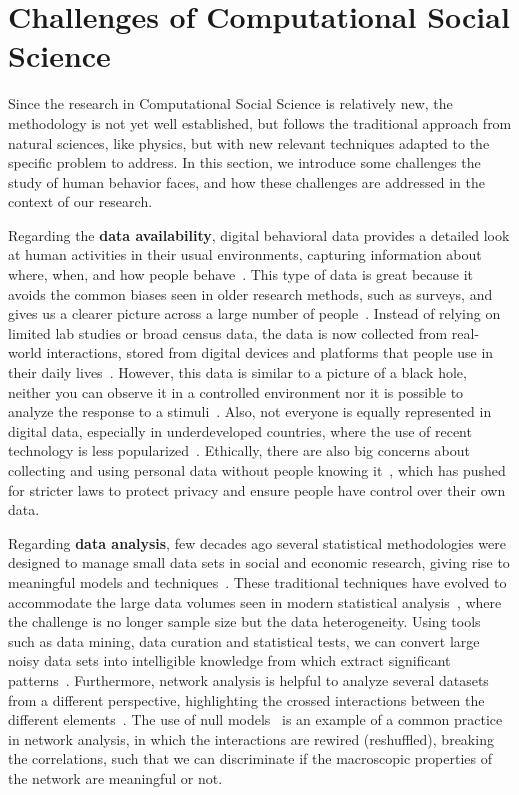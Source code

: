 \section{\label{sec:Challenges of Computational Social Science} Challenges of Computational Social Science}

Since the research in Computational Social Science is relatively new, the methodology is not yet well established, but follows the traditional approach from natural sciences, like physics, but with new relevant techniques adapted to the specific problem to address. In this section, we introduce some challenges the study of human behavior faces, and how these challenges are addressed in the context of our research.

Regarding the \textbf{data availability}, digital behavioral data provides a detailed look at human activities in their usual environments, capturing information about where, when, and how people behave~\cite{Eagle2006RealityMining}. This type of data is great because it avoids the common biases seen in older research methods, such as surveys, and gives us a clearer picture across a large number of people~\cite{Lazer2009CompSocSci,chen-2014}. Instead of relying on limited lab studies or broad census data, the data is now collected from real-world interactions, stored from digital devices and platforms that people use in their daily lives~\cite{Eckmann2004Entropy,blondel-2015,artime-2017}. However, this data is similar to a picture of a black hole, neither you can observe it in a controlled environment nor it is possible to analyze the response to a stimuli~\cite{lazer-2014}. Also, not everyone is equally represented in digital data, especially in underdeveloped countries, where the use of recent technology is less popularized~\cite{zook-2017}. Ethically, there are also big concerns about collecting and using personal data without people knowing it~\cite{boyd-2012, de-montjoye-2013}, which has pushed for stricter laws to protect privacy and ensure people have control over their own data.

Regarding  \textbf{data analysis}, few decades ago several statistical methodologies were designed to manage small data sets in social and economic research, giving rise to meaningful models and techniques~\cite{stevens-2012, gelman-2006}. These traditional techniques have evolved to accommodate the large data volumes seen in modern statistical analysis~\cite{hastie-2013}, where the challenge is no longer sample size but the data heterogeneity. Using tools such as data mining, data curation and statistical tests, we can convert large noisy data sets into intelligible knowledge from which extract significant patterns~\cite{witten-2005}. Furthermore, network analysis is helpful to analyze several datasets from a different perspective, highlighting the crossed interactions between the different elements~\cite{newman-book, clauset-2008}. The use of null models~\cite{perry2012null,gauvin-2022} is an example of a common practice in network analysis, in which the interactions are rewired (reshuffled), breaking the correlations, such that we can discriminate if the macroscopic properties of the network are meaningful or not.

